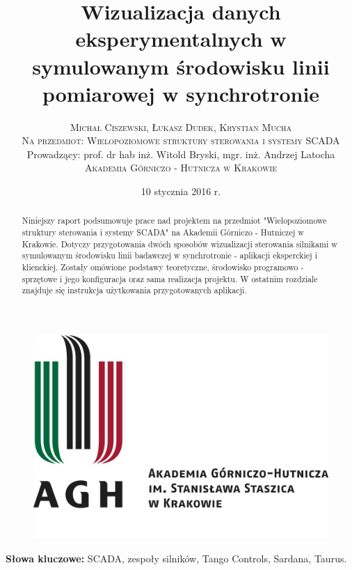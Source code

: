 \documentclass[twoside]{article}
\title{\vspace{-15mm}\fontsize{24pt}{10pt}\selectfont\textbf{Wizualizacja danych eksperymentalnych w symulowanym środowisku linii pomiarowej w synchrotronie}} %
\author{
\large
\textsc{Michał Ciszewski, Łukasz Dudek, Krystian Mucha}\\[3mm] %
\textsc{Na przedmiot: Wielopoziomowe struktury sterowania i systemy SCADA}\\[3mm] %
\normalsize Prowadzący: prof. dr hab inż. Witold Bryski, mgr. inż. Andrzej Latocha\\[4mm]
\textsc{Akademia Górniczo - Hutnicza w Krakowie}\\[1mm] %
}
\date{10 stycznia 2016 r.}
\begin{document}
	
\begin{figure}
	\centering
	\includegraphics[width=0.9\linewidth]{Grafika/agh_logo}
	\label{fig:agh-logo}
\end{figure}

\maketitle %

\thispagestyle{fancy} %

\clearpage


\vspace{10mm}
\begin{abstract}

\noindent Niniejszy raport podsumowuje prace nad projektem na przedmiot "Wielopoziomowe struktury sterowania i systemy SCADA" na Akademii Górniczo - Hutniczej w Krakowie. Dotyczy przygotowania dwóch sposobów wizualizacji sterowania silnikami w symulowanym środowisku linii badawczej w synchrotronie - aplikacji eksperckiej i klienckiej. Zostały omówione podstawy teoretyczne, środowisko programowo - sprzętowe i jego konfiguracja oraz sama realizacja projektu. W ostatnim rozdziale znajduje się instrukcja użytkowania przygotowanych aplikacji.

\end{abstract}

\smallskip
\noindent \textbf{Słowa kluczowe:} SCADA, zespoły silników, Tango Controls, Sardana, Taurus.

\tableofcontents
\end{document}
